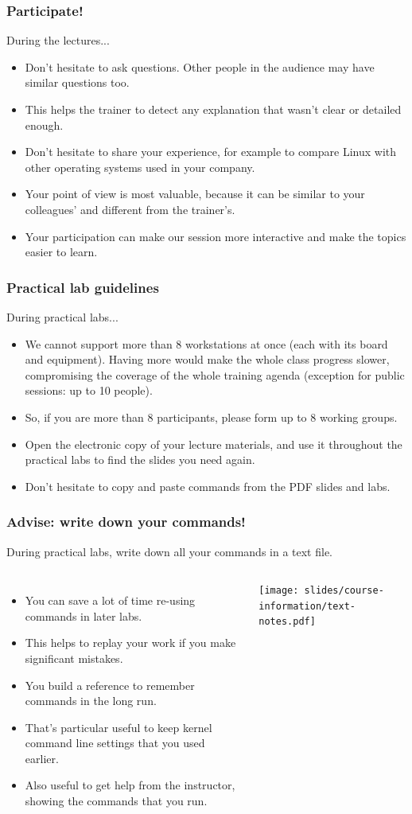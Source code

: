 \begin{frame}
\frametitle{Participate!}
During the lectures...
\begin{itemize}
\item Don't hesitate to ask questions. Other people in the audience may have
similar questions too.
\item This helps the trainer to detect any explanation that wasn't clear or
detailed enough.
\item Don't hesitate to share your experience, for example to compare Linux
with other operating systems used in your company.
\item Your point of view is most valuable, because it can be similar to your
colleagues' and different from the trainer's.
\item Your participation can make our session more interactive and make the
topics easier to learn.
\end{itemize}
\end{frame}

\begin{frame}
\frametitle{Practical lab guidelines}
During practical labs...
\begin{itemize}
\item We cannot support more than 8 workstations at once (each with its board
and equipment). Having more would make the whole class progress slower,
compromising the coverage of the whole training agenda (exception for public
sessions: up to 10 people).
\item So, if you are more than 8 participants, please form up to 8 working
groups.
\item Open the electronic copy of your lecture materials, and use it throughout
the practical labs to find the slides you need again.
\item Don't hesitate to copy and paste commands from the PDF slides and
labs.
\end{itemize}
\end{frame}

\begin{frame}
\frametitle{Advise: write down your commands!}
During practical labs, write down all your commands in a text file.
\begin{columns}
  \begin{itemize}
  \item You can save a lot of time re-using commands in later labs.
  \item This helps to replay your work if you make significant mistakes.
  \item You build a reference to remember commands in the long run.
  \item That's particular useful to keep kernel command line settings
        that you used earlier.
  \item Also useful to get help from the instructor, showing the
        commands that you run.
  \end{itemize}
  \texttt{[image: slides/course-information/text-notes.pdf]}
\end{columns}
\end{frame}

